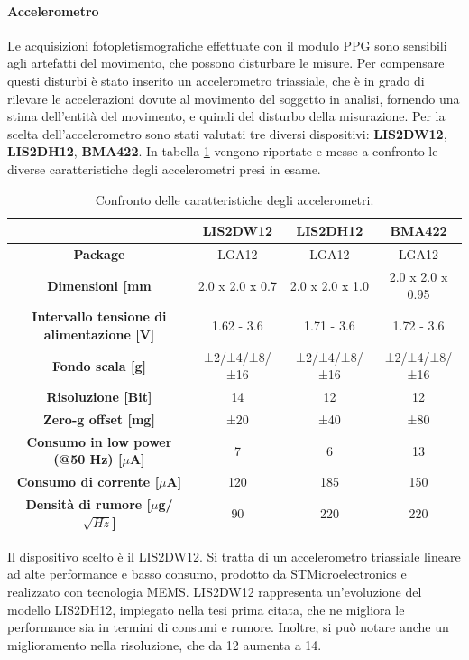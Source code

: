 \paragraph{Accelerometro} 
Le acquisizioni fotopletismografiche effettuate con il modulo PPG sono sensibili agli artefatti del movimento, che possono disturbare le misure. Per compensare questi disturbi è stato inserito un accelerometro triassiale, che  è in grado di rilevare le accelerazioni dovute al movimento del soggetto in analisi, fornendo una stima dell'entità del movimento, e quindi del disturbo della misurazione.
Per la scelta dell'accelerometro sono stati valutati tre diversi dispositivi: \textbf{LIS2DW12}\cite{STElectronicsLIS2DW12}, \textbf{LIS2DH12}\cite{STMicroelectronics2017}, \textbf{BMA422}\cite{BoshBMA422}. In tabella \ref{tab:ConfrontoAccelerometri} vengono riportate e messe a confronto le diverse caratteristiche degli accelerometri presi in esame.
\begin{table}[h]
	\renewcommand{\arraystretch}{1.5}
	\centering
	\footnotesize
	\begin{tabular}{cccc}
		\hline & \textbf{LIS2DW12} & \textbf{LIS2DH12} & \textbf{BMA422} \\ \hline
		\textbf{Package} & LGA12 & LGA12 & LGA12 \\ \hline
		\textbf{Dimensioni {[}mm\ap{2}{]}}& 2.0 x 2.0 x 0.7 & 2.0 x 2.0 x 1.0 & 2.0 x 2.0 x 0.95\\\hline
		\textbf{Intervallo tensione di alimentazione {[}V{]}}&1.62 - 3.6&1.71 - 3.6&1.72 - 3.6\\ \hline
		\textbf{Fondo scala [g]} &  ±2/±4/±8/±16   &    ±2/±4/±8/±16   &   ±2/±4/±8/±16 \\ \hline
		\textbf{Risoluzione [Bit]} &   14   &    12     & 12 \\ \hline
		\textbf{Zero-g offset [mg]} &   ±20   &    ±40     & ±80 \\ \hline		
		\textbf{Consumo in low power (@50 Hz) {[}$\mu$A{]}} &   7   &    6     &   13\\ \hline
		\textbf{Consumo di corrente {[}$\mu$A{]}} &   120   &    185     &   150\\ \hline
		\textbf{Densità di rumore {[}$\mu$g/$\sqrt{Hz}${]}} &  90   &    220     &   220\\ \hline
	\end{tabular}
	\caption{Confronto delle caratteristiche degli accelerometri.}
	\label{tab:ConfrontoAccelerometri}
\end{table}
Il dispositivo scelto è il LIS2DW12. Si tratta di un accelerometro triassiale lineare ad alte performance e basso consumo, prodotto da STMicroelectronics e realizzato con tecnologia MEMS. LIS2DW12 rappresenta un'evoluzione del modello LIS2DH12, impiegato nella tesi prima citata\cite{Ingegneria2018}, che ne migliora le performance sia in termini di consumi e rumore. Inoltre, si può notare anche un miglioramento nella risoluzione, che da \SI{12}{\bit} aumenta a \SI{14}{\bit}.
